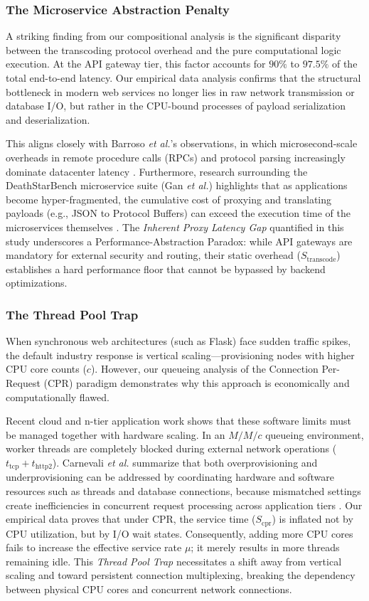 \documentclass{ieeeaccess}
\begin{document}
\subsubsection{The Microservice Abstraction Penalty}
A striking finding from our compositional analysis is the significant disparity between the transcoding protocol overhead and the pure computational logic execution. At the API gateway tier, this factor accounts for $90\%$ to $97.5\%$ of the total end-to-end latency. Our empirical data analysis confirms that the structural bottleneck in modern web services no longer lies in raw network transmission or database I/O, but rather in the CPU-bound processes of payload serialization and deserialization.

This aligns closely with Barroso \emph{et al.}'s observations, in which microsecond-scale overheads in remote procedure calls (RPCs) and protocol parsing increasingly dominate datacenter latency \cite{barroso2017attack}. Furthermore, research surrounding the DeathStarBench microservice suite (Gan \emph{et al.}) highlights that as applications become hyper-fragmented, the cumulative cost of proxying and translating payloads (e.g., JSON to Protocol Buffers) can exceed the execution time of the microservices themselves \cite{gan2019deathstarbench}. The \textit{Inherent Proxy Latency Gap} quantified in this study underscores a Performance-Abstraction Paradox: while API gateways are mandatory for external security and routing, their static overhead ($S_{\text{transcode}}$) establishes a hard performance floor that cannot be bypassed by backend optimizations.

\subsubsection{The Thread Pool Trap}
When synchronous web architectures (such as Flask) face sudden traffic spikes, the default industry response is vertical scaling—provisioning nodes with higher CPU core counts ($c$). However, our queueing analysis of the Connection Per-Request (CPR) paradigm demonstrates why this approach is economically and computationally flawed.

Recent cloud and n-tier application work shows that these software limits must be managed together with hardware scaling. In an $M/M/c$ queueing environment, worker threads are completely blocked during external network operations ($t_{\text{tcp}} + t_{\text{http2}}$). Carnevali \emph{et al.} summarize that both overprovisioning and underprovisioning can be addressed by coordinating hardware and software resources such as threads and database connections, because mismatched settings create inefficiencies in concurrent request processing across application tiers \cite{carnevali2025compositional}. Our empirical data proves that under CPR, the service time ($S_{\text{cpr}}$) is inflated not by CPU utilization, but by I/O wait states. Consequently, adding more CPU cores fails to increase the effective service rate $\mu$; it merely results in more threads remaining idle. This \textit{Thread Pool Trap} necessitates a shift away from vertical scaling and toward persistent connection multiplexing, breaking the dependency between physical CPU cores and concurrent network connections.
\end{document}
